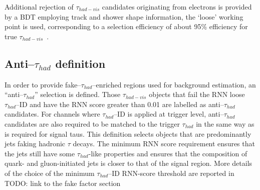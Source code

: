 Additional rejection of $\tau_{had-vis}$ candidates originating 
from electrons is provided by a BDT employing track
and shower shape information, the `loose' working point is used, 
corresponding to a selection efficiency
of about 95\% efficiency for true $\tau_{had-vis}$~\cite{ATLAS-CONF-2017-029}.

\subsection{Anti--$\tau_{had}$ definition}
In order to provide fake--$\tau_{had}$--enriched regions used for background estimation, 
an ``anti--$\tau_{had}$'' selection is defined. 
Those $\tau_{had-vis}$ objects that fail the RNN loose $\tau_{had}$--ID 
and have the RNN score greater than 0.01 are labelled as anti--$\tau_{had}$ candidates. 
For channels where $\tau_{had}$--ID is applied at trigger level, anti--$\tau_{had}$
candidates are also required to be matched to the trigger $\tau_{had}$ in 
the same way as is required for signal taus.
This definition selects objects that are 
predominantly jets faking hadronic $\tau$ decays. 
The minimum RNN score requirement ensures that 
the jets still have some $\tau_{had}$-like properties 
and ensures that the composition of quark- and gluon-initiated jets 
is closer to that of the signal region.
More details of the choice of the minimum $\tau_{had}$--ID RNN-score
threshold are reported in TODO: link to the fake factor section
